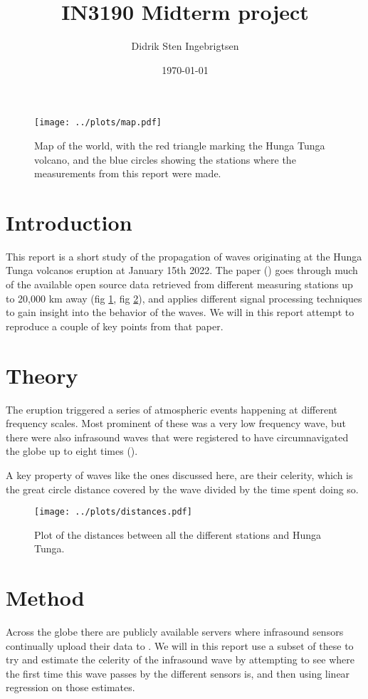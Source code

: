 \documentclass[11pt, a4paper]{article}
\title{IN3190 Midterm project}
\author{Didrik Sten Ingebrigtsen}
\date{\today}
\begin{document}
\maketitle

\begin{figure}
\texttt{[image: ../plots/map.pdf]}
\caption{Map of the world, with the red triangle marking the Hunga Tunga volcano, and the blue circles showing the stations where the measurements from this report were made.}
\label{fig:map}
\end{figure}

\section{Introduction}
This report is a short study of the propagation of waves originating at the Hunga Tunga volcanos eruption at January 15th 2022. The paper (\cite{nhess}) goes through much of the available open source data retrieved from different measuring stations up to 20,000 km away (fig \ref{fig:map}, fig \ref{fig:distances}), and applies different signal processing techniques to gain insight into the behavior of the waves. We will in this report attempt to reproduce a couple of key points from that paper.

\section{Theory}
The eruption triggered a series of atmospheric events happening at different frequency scales. Most prominent of these was a very low frequency wave, but there were also infrasound waves that were registered to have circumnavigated the globe up to eight times (\cite{vergoz}).

A key property of waves like the ones discussed here, are their celerity, which is the great circle distance covered by the wave divided by the time spent doing so.

\begin{figure}
\texttt{[image: ../plots/distances.pdf]}
\caption{Plot of the distances between all the different stations and Hunga Tunga.}
\label{fig:distances}
\end{figure}

\section{Method}
Across the globe there are publicly available servers where infrasound sensors continually upload their data to \cite{nhess}. We will in this report use a subset of these to try and estimate the celerity of the infrasound wave by attempting to see where the first time this wave passes by the different sensors is, and then using linear regression on those estimates.
\end{document}
